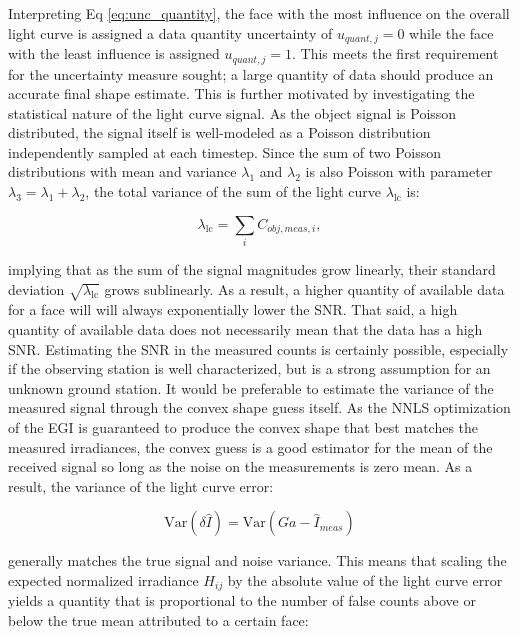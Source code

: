 Interpreting Eq \ref{eq:unc_quantity}, the face with the most influence on the overall light curve is assigned a data quantity uncertainty of $u_{quant,j} = 0$ while the face with the least influence is assigned $u_{quant,j} = 1$. This meets the first requirement for the uncertainty measure sought; a large quantity of data should produce an accurate final shape estimate. This is further motivated by investigating the statistical nature of the light curve signal. As the object signal is Poisson distributed, the signal itself is well-modeled as a Poisson distribution independently sampled at each timestep. Since the sum of two Poisson distributions with mean and variance $\lambda_1$ and $\lambda_2$ is also Poisson with parameter $\lambda_3 = \lambda_1 + \lambda_2$, the total variance of the sum of the light curve $\lambda_\mathrm{lc}$ is:

\begin{equation}
  \lambda_\mathrm{lc} = \sum_{i} C_{obj,meas,i},
\end{equation}

implying that as the sum of the signal magnitudes grow linearly, their standard deviation $\sqrt{\lambda_\mathrm{lc}}$ grows sublinearly. As a result, a higher quantity of available data for a face will will always exponentially lower the SNR. That said, a high quantity of available data does not necessarily mean that the data has a high SNR. Estimating the SNR in the measured counts is certainly possible, especially if the observing station is well characterized, but is a strong assumption for an unknown ground station. It would be preferable to estimate the variance of the measured signal through the convex shape guess itself. As the NNLS optimization of the EGI is guaranteed to produce the convex shape that best matches the measured irradiances, the convex guess is a good estimator for the mean of the received signal so long as the noise on the measurements is zero mean. As a result, the variance of the light curve error:

\begin{equation}
  \mathrm{Var}\left(\delta \hat{I}\right) = \mathrm{Var}\left(Ga - \hat{I}_{meas}\right)
\end{equation}

generally matches the true signal and noise variance. This means that scaling the expected normalized irradiance $H_{ij}$ by the absolute value of the light curve error yields a quantity that is proportional to the number of false counts above or below the true mean attributed to a certain face:

